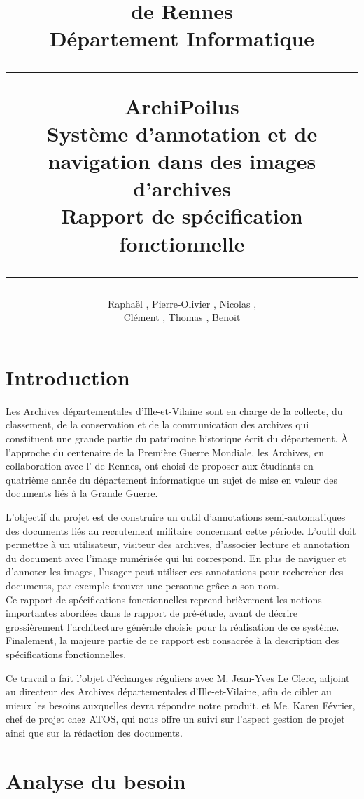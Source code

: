 \documentclass[a4paper]{article}
\title{\bsc{INSA} de Rennes \\ Département Informatique \\ \bigskip \hrule \bigskip ArchiPoilus \\ \bigskip Système d'annotation et de navigation dans des images d'archives \\ \bigskip Rapport de spécification fonctionnelle \bigskip \hrule}
\author{Raphaël \bsc{Baron}, Pierre-Olivier \bsc{Bouteau}, Nicolas \bsc{Charpentier}, \\ Clément \bsc{Leboullenger}, Thomas \bsc{François}, Benoit \bsc{Travers}}
\begin{document}
\maketitle
\thispagestyle{empty}

\newpage
\tableofcontents
\thispagestyle{empty}

\newpage
\section*{Introduction}

	Les Archives départementales d'Ille-et-Vilaine sont en charge de la collecte, du classement, de la conservation et de la communication des archives qui constituent une grande partie du patrimoine historique écrit du département. 
\`A l'approche du centenaire de la Première Guerre Mondiale, les Archives, en collaboration avec l' de Rennes, ont choisi de proposer aux étudiants en quatrième année du département informatique un sujet de mise en valeur des documents li\'es \`a la Grande Guerre.

	L'objectif du projet est de construire un outil d'annotations semi-auto\-matiques des documents liés au recrutement militaire concernant cette période. L'outil doit permettre à un utilisateur, visiteur des archives, d'associer lecture et annotation du document avec l'image numérisée qui lui correspond. En plus de naviguer et d'annoter les images, l'usager peut utiliser ces annotations pour rechercher des documents, par exemple trouver une personne grâce a son nom.\\
	
	Ce rapport de spécifications fonctionnelles reprend brièvement les notions importantes abordées dans le rapport de pré-étude, avant de décrire grossièrement l'architecture générale choisie pour la réalisation de ce système. Finalement, la majeure partie de ce rapport est consacrée à la description des spécifications fonctionnelles.
	
	Ce travail a fait l'objet d'échanges réguliers avec M. Jean-Yves Le Clerc, adjoint au directeur des Archives départementales d’Ille-et-Vilaine, afin de cibler au mieux les besoins auxquelles devra répondre notre produit, et Me. Karen Février, chef de projet chez ATOS, qui nous offre un suivi sur l'aspect gestion de projet ainsi que sur la rédaction des documents.

\newpage

\section{Analyse du besoin}
\end{document}

